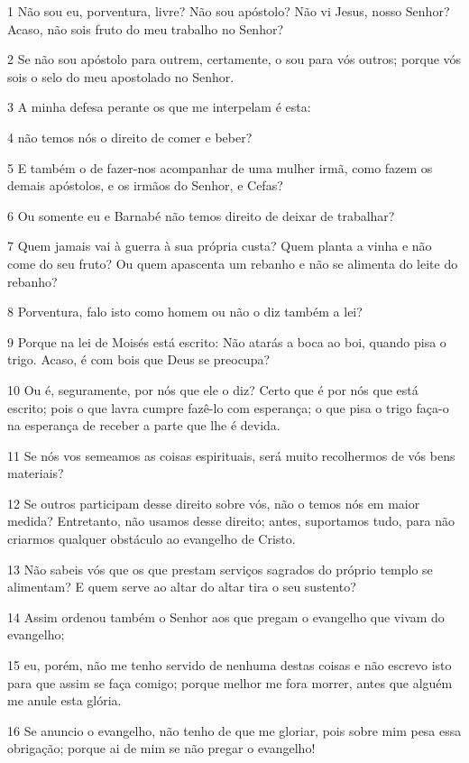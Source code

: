 \par 1 Não sou eu, porventura, livre? Não sou apóstolo? Não vi Jesus, nosso Senhor? Acaso, não sois fruto do meu trabalho no Senhor?
\par 2 Se não sou apóstolo para outrem, certamente, o sou para vós outros; porque vós sois o selo do meu apostolado no Senhor.
\par 3 A minha defesa perante os que me interpelam é esta:
\par 4 não temos nós o direito de comer e beber?
\par 5 E também o de fazer-nos acompanhar de uma mulher irmã, como fazem os demais apóstolos, e os irmãos do Senhor, e Cefas?
\par 6 Ou somente eu e Barnabé não temos direito de deixar de trabalhar?
\par 7 Quem jamais vai à guerra à sua própria custa? Quem planta a vinha e não come do seu fruto? Ou quem apascenta um rebanho e não se alimenta do leite do rebanho?
\par 8 Porventura, falo isto como homem ou não o diz também a lei?
\par 9 Porque na lei de Moisés está escrito: Não atarás a boca ao boi, quando pisa o trigo. Acaso, é com bois que Deus se preocupa?
\par 10 Ou é, seguramente, por nós que ele o diz? Certo que é por nós que está escrito; pois o que lavra cumpre fazê-lo com esperança; o que pisa o trigo faça-o na esperança de receber a parte que lhe é devida.
\par 11 Se nós vos semeamos as coisas espirituais, será muito recolhermos de vós bens materiais?
\par 12 Se outros participam desse direito sobre vós, não o temos nós em maior medida? Entretanto, não usamos desse direito; antes, suportamos tudo, para não criarmos qualquer obstáculo ao evangelho de Cristo.
\par 13 Não sabeis vós que os que prestam serviços sagrados do próprio templo se alimentam? E quem serve ao altar do altar tira o seu sustento?
\par 14 Assim ordenou também o Senhor aos que pregam o evangelho que vivam do evangelho;
\par 15 eu, porém, não me tenho servido de nenhuma destas coisas e não escrevo isto para que assim se faça comigo; porque melhor me fora morrer, antes que alguém me anule esta glória.
\par 16 Se anuncio o evangelho, não tenho de que me gloriar, pois sobre mim pesa essa obrigação; porque ai de mim se não pregar o evangelho!
